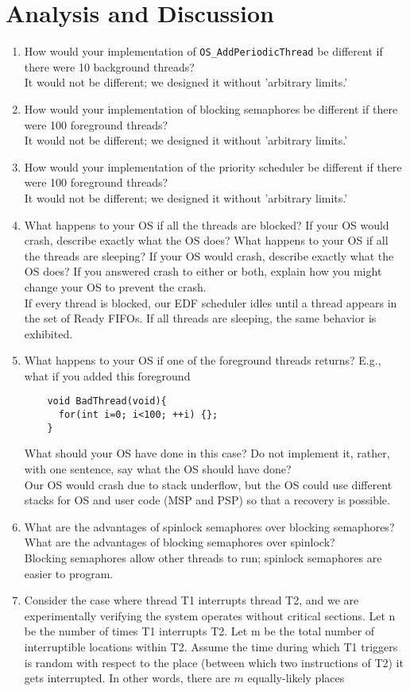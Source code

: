 \documentclass[12pt]{article}
\begin{document}
\section{Analysis and Discussion}

\begin{enumerate}[1)]
\item How would your implementation of \verb|OS_AddPeriodicThread| be
  different if there were 10 background threads? \\
  It would not be different; we designed it without 'arbitrary limits.'
\item How would your implementation of blocking semaphores be
  different if there were 100 foreground threads? \\
  It would not be different; we designed it without 'arbitrary limits.'
\item How would your implementation of the priority scheduler be
  different if there were 100 foreground threads? \\
  It would not be different; we designed it without 'arbitrary limits.'
\item What happens to your OS if all the threads are blocked? If your
  OS would crash, describe exactly what the OS does? What happens to
  your OS if all the threads are sleeping? If your OS would crash,
  describe exactly what the OS does? If you answered crash to either
  or both, explain how you might change your OS to prevent the crash. \\
  If every thread is blocked, our EDF scheduler idles until a thread
  appears in the set of Ready FIFOs. If all threads are sleeping, the
  same behavior is exhibited.
\item What happens to your OS if one of the foreground threads
  returns? E.g., what if you added this foreground
  \begin{verbatim}
    void BadThread(void){
      for(int i=0; i<100; ++i) {};
    }
  \end{verbatim}
  What should your OS have done in this case? Do not implement it,
  rather, with one sentence, say what the OS should have done? \\
  Our OS would crash due to stack underflow, but the OS could use
  different stacks for OS and user code (MSP and PSP) so that a
  recovery is possible.
\item What are the advantages of spinlock semaphores over blocking
  semaphores? What are the advantages of blocking semaphores over
  spinlock? \\
  Blocking semaphores allow other threads to run; spinlock semaphores
  are easier to program.
\item Consider the case where thread T1 interrupts thread T2, and we
  are experimentally verifying the system operates without critical
  sections. Let n be the number of times T1 interrupts T2. Let m be
  the total number of interruptible locations within T2. Assume the
  time during which T1 triggers is random with respect to the place
  (between which two instructions of T2) it gets interrupted. In other
  words, there are $m$ equally-likely places %
\end{enumerate}
\end{document}
